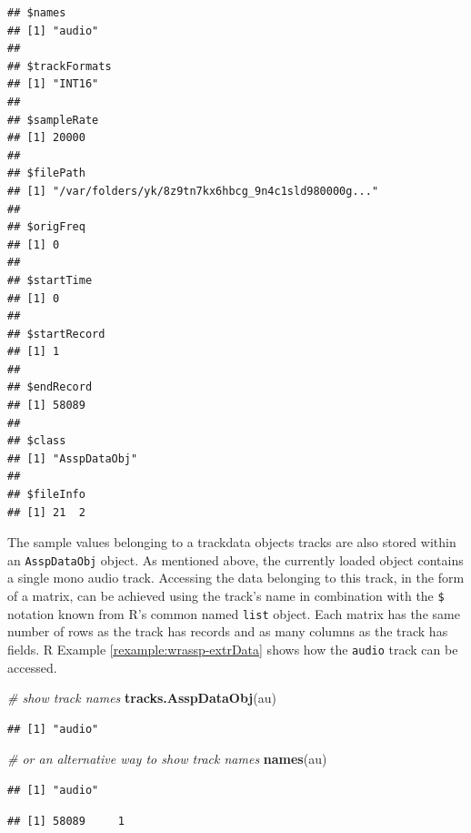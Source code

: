 \documentclass[]{book}
\newenvironment{Shaded}{\begin{snugshade}}{\end{snugshade}}
\newcommand{\CommentTok}[1]{\textcolor[rgb]{0.56,0.35,0.01}{\textit{#1}}}
\newcommand{\KeywordTok}[1]{\textcolor[rgb]{0.13,0.29,0.53}{\textbf{#1}}}
\newcommand{\NormalTok}[1]{#1}
\newcommand{\OperatorTok}[1]{\textcolor[rgb]{0.81,0.36,0.00}{\textbf{#1}}}
\theoremstyle{definition}
\theoremstyle{definition}
\theoremstyle{definition}
\theoremstyle{remark}
\begin{document}
\begin{verbatim}
## $names
## [1] "audio"
## 
## $trackFormats
## [1] "INT16"
## 
## $sampleRate
## [1] 20000
## 
## $filePath
## [1] "/var/folders/yk/8z9tn7kx6hbcg_9n4c1sld980000g..."
## 
## $origFreq
## [1] 0
## 
## $startTime
## [1] 0
## 
## $startRecord
## [1] 1
## 
## $endRecord
## [1] 58089
## 
## $class
## [1] "AsspDataObj"
## 
## $fileInfo
## [1] 21  2
\end{verbatim}

The sample values belonging to a trackdata objects tracks are also
stored within an \texttt{AsspDataObj} object. As mentioned above, the
currently loaded object contains a single mono audio track. Accessing
the data belonging to this track, in the form of a matrix, can be
achieved using the track's name in combination with the \texttt{\$}
notation known from R's common named \texttt{list} object. Each matrix
has the same number of rows as the track has records and as many columns
as the track has fields. R Example \ref{rexample:wrassp-extrData} shows
how the \texttt{audio} track can be accessed.

\begin{Shaded}
\begin{Highlighting}[]
\CommentTok{# show track names}
\KeywordTok{tracks.AsspDataObj}\NormalTok{(au)}
\end{Highlighting}
\end{Shaded}

\begin{verbatim}
## [1] "audio"
\end{verbatim}

\begin{Shaded}
\begin{Highlighting}[]
\CommentTok{# or an alternative way to show track names}
\KeywordTok{names}\NormalTok{(au)}
\end{Highlighting}
\end{Shaded}

\begin{verbatim}
## [1] "audio"
\end{verbatim}

\begin{Shaded}
\end{Shaded}

\begin{verbatim}
## [1] 58089     1
\end{verbatim}
\end{document}
